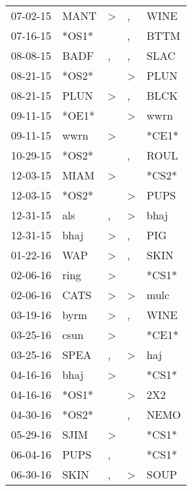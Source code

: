 \begin{supertabular}{lllll}
 07-02-15 &   MANT &     \textgreater &                , &   WINE \\
 07-16-15 &  *OS1* &                  &                , &   BTTM \\
 08-08-15 &   BADF &                , &                , &   SLAC \\
 08-21-15 &  *OS2* &                  &     \textgreater &   PLUN \\
 08-21-15 &   PLUN &     \textgreater &                , &   BLCK \\
 09-11-15 &  *OE1* &                  &     \textgreater &   wwrn \\
 09-11-15 &   wwrn &     \textgreater &                  &  *CE1* \\
 10-29-15 &  *OS2* &                  &                , &   ROUL \\
 12-03-15 &   MIAM &     \textgreater &                  &  *CS2* \\
 12-03-15 &  *OS2* &                  &     \textgreater &   PUPS \\
 12-31-15 &    als &                , &     \textgreater &   bhaj \\
 12-31-15 &   bhaj &     \textgreater &                , &    PIG \\
 01-22-16 &    WAP &     \textgreater &                , &   SKIN \\
 02-06-16 &   ring &     \textgreater &                  &  *CS1* \\
 02-06-16 &   CATS &     \textgreater &     \textgreater &   mulc \\
 03-19-16 &   byrm &     \textgreater &                , &   WINE \\
 03-25-16 &   csun &     \textgreater &                  &  *CE1* \\
 03-25-16 &   SPEA &                , &     \textgreater &    haj \\
 04-16-16 &   bhaj &     \textgreater &                  &  *CS1* \\
 04-16-16 &  *OS1* &                  &     \textgreater &    2X2 \\
 04-30-16 &  *OS2* &                  &                , &   NEMO \\
 05-29-16 &   SJIM &     \textgreater &                  &  *CS1* \\
 06-04-16 &   PUPS &                , &                  &  *CS1* \\
 06-30-16 &   SKIN &                , &     \textgreater &   SOUP \\

\end{supertabular}
